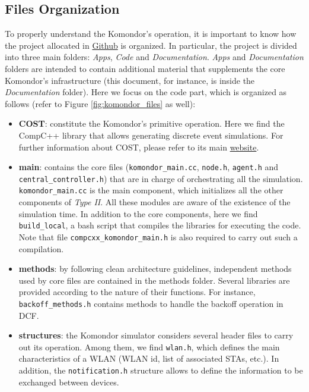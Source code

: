 \documentclass[a4paper]{article}
\begin{document}
\subsection{Files Organization}
\label{section:files}		
To properly understand the Komondor's operation, it is important to know how the project allocated in \href{https://github.com/wn-upf/Komondor}{Github} is organized. In particular, the project is divided into three main folders: \textit{Apps}, \textit{Code} and \textit{Documentation}. \textit{Apps} and \textit{Documentation} folders are intended to contain additional material that supplements the core Komondor's infrastructure (this document, for instance, is inside the \textit{Documentation} folder). Here we focus on the code part, which is organized as follows (refer to Figure \ref{fig:komondor_files} as well):
\begin{itemize}
	\item \textbf{COST}: constitute the Komondor's primitive operation. Here we find the CompC++ library that allows generating discrete event simulations. For further information about COST, please refer to its main \href{http://www.ita.cs.rpi.edu/cost.html}{website}. 
	\item \textbf{main}: contains the core files (\texttt{komondor\_main.cc}, \texttt{node.h}, \texttt{agent.h} and \texttt{central\_controller.h}) that are in charge of orchestrating all the simulation.  \texttt{komondor\_main.cc} is the main component, which initializes all the other components of \textit{Type II}. All these modules are aware of the existence of the simulation time. In addition to the core components, here we find \texttt{build\_local}, a bash script that compiles the libraries for executing the code. Note that file \texttt{compcxx\_komondor\_main.h} is also required to carry out such a compilation.
	\item \textbf{methods}: by following clean architecture guidelines, independent methods used by core files are contained in the methods folder. Several libraries are provided according to the nature of their functions. For instance, \texttt{backoff\_methods.h} contains methods to handle the backoff operation in DCF.
	\item \textbf{structures}: the Komondor simulator considers several header files to carry out its operation. Among them, we find \texttt{wlan.h}, which defines the main characteristics of a WLAN (WLAN id, list of associated STAs, etc.). In addition, the \texttt{notification.h} structure allows to define the information to be exchanged between devices. 

\end{itemize}
\end{document}
